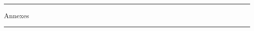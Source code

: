 \begin{titlepage}
\begin{center}
~\vfill
\hrule
\vfill
\Huge Annexes
\vfill
\hrule
\vfill
\end{center}
\end{titlepage} 
\clearpage